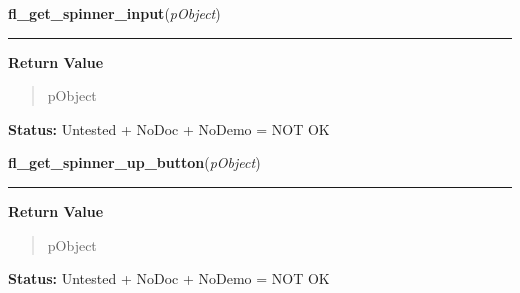 \hspace{.8\funcindent}\begin{boxedminipage}{\funcwidth}

    \raggedright \textbf{fl\_get\_spinner\_input}(\textit{pObject})

    \vspace{-1.5ex}

    \rule{\textwidth}{0.5\fboxrule}
\setlength{\parskip}{2ex}
\setlength{\parskip}{1ex}
      \textbf{Return Value}
    \vspace{-1ex}

      \begin{quote}
      pObject

      \end{quote}

\textbf{Status:} Untested + NoDoc + NoDemo = NOT OK



    \end{boxedminipage}

    \label{xformslib:library:fl_get_spinner_up_button}

    \vspace{0.5ex}

\hspace{.8\funcindent}\begin{boxedminipage}{\funcwidth}

    \raggedright \textbf{fl\_get\_spinner\_up\_button}(\textit{pObject})

    \vspace{-1.5ex}

    \rule{\textwidth}{0.5\fboxrule}
\setlength{\parskip}{2ex}
\setlength{\parskip}{1ex}
      \textbf{Return Value}
    \vspace{-1ex}

      \begin{quote}
      pObject

      \end{quote}

\textbf{Status:} Untested + NoDoc + NoDemo = NOT OK



    \end{boxedminipage}

    \label{xformslib:library:fl_get_spinner_down_button}

